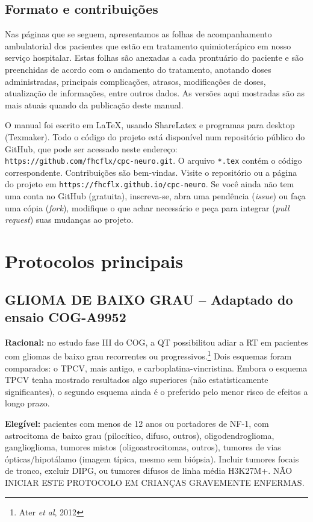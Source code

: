 \documentclass[11pt,a4paper,oldfontcommands]{memoir}
\begin{document}
\section{Formato e contribuições}

Nas páginas que se seguem, apresentamos as folhas de acompanhamento ambulatorial dos pacientes que estão em tratamento quimioterápico em nosso serviço hospitalar. Estas folhas são anexadas a cada prontuário do paciente e são preenchidas de acordo com o andamento do tratamento, anotando doses administradas, principais complicações, atrasos, modificações de doses, atualização de informações, entre outros dados. As versões aqui mostradas são as mais atuais quando da publicação deste manual.

O manual foi escrito em LaTeX, usando ShareLatex e programas para desktop (Texmaker). Todo o código do projeto está disponível num repositório público do GitHub, que pode ser acessado neste endereço: \texttt{https://github.com/fhcflx/cpc-neuro.git}. O arquivo \texttt{*.tex} contém o código correspondente. Contribuições são bem-vindas. Visite o repositório ou a página do projeto em \texttt{https://fhcflx.github.io/cpc-neuro}. Se você ainda não tem uma conta no GitHub (gratuita), inscreva-se, abra uma pendência (\textit{issue}) ou faça uma cópia (\textit{fork}), modifique o que achar necessário e peça para integrar (\textit{pull request}) suas mudanças ao projeto.
\cleardoublepage
\chapter{Protocolos principais}
\cleardoublepage
\section{GLIOMA DE BAIXO GRAU -- Adaptado do ensaio COG-A9952}
\let\thefootnote\relax{}
\textbf{Racional:} no estudo fase III do COG, a QT possibilitou adiar a RT em pacientes com gliomas de baixo grau recorrentes ou progressivos.\footnote{Ater \textit{et al}, 2012} Dois esquemas foram comparados: o TPCV, mais antigo, e carboplatina-vincristina. Embora o esquema TPCV tenha mostrado resultados algo superiores (não estatisticamente significantes), o segundo esquema ainda é o preferido pelo menor risco de efeitos a longo prazo.

\textbf{Elegível:} pacientes com menos de 12 anos ou portadores de NF-1, com astrocitoma de baixo grau (pilocítico, difuso, outros), oligodendroglioma, ganglioglioma, tumores mistos (oligoastrocitomas, outros), tumores de vias ópticas/hipotálamo (imagem típica, mesmo sem biópsia). Incluir tumores focais de tronco, excluir DIPG, ou tumores difusos de linha média H3K27M+. NÃO INICIAR ESTE PROTOCOLO EM CRIANÇAS GRAVEMENTE ENFERMAS.
\end{document}
